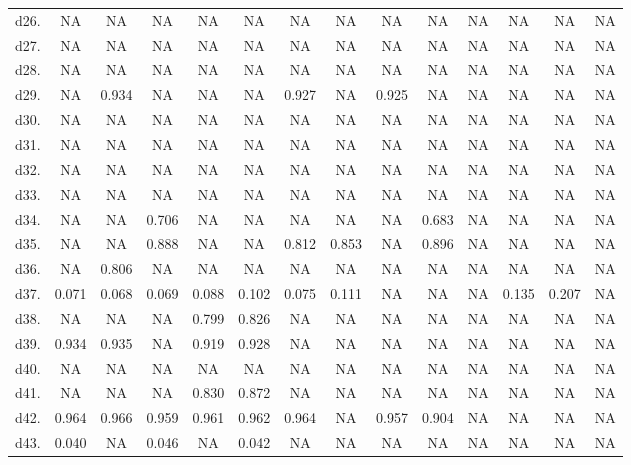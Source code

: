 \begin{table}
\begin{tabular}{lccccccccccccc}
d26.  & NA    & NA    & NA    & NA    & NA    & NA    & NA    & NA    & NA    & NA    & NA    & NA    & NA \\
d27.  & NA    & NA    & NA    & NA    & NA    & NA    & NA    & NA    & NA    & NA    & NA    & NA    & NA \\
d28.  & NA    & NA    & NA    & NA    & NA    & NA    & NA    & NA    & NA    & NA    & NA    & NA    & NA \\
d29.  & NA    & 0.934 & NA    & NA    & NA    & 0.927 & NA    & 0.925 & NA    & NA    & NA    & NA    & NA \\
d30.  & NA    & NA    & NA    & NA    & NA    & NA    & NA    & NA    & NA    & NA    & NA    & NA    & NA \\
d31.  & NA    & NA    & NA    & NA    & NA    & NA    & NA    & NA    & NA    & NA    & NA    & NA    & NA \\
d32.  & NA    & NA    & NA    & NA    & NA    & NA    & NA    & NA    & NA    & NA    & NA    & NA    & NA \\
d33.  & NA    & NA    & NA    & NA    & NA    & NA    & NA    & NA    & NA    & NA    & NA    & NA    & NA \\
d34.  & NA    & NA    & 0.706 & NA    & NA    & NA    & NA    & NA    & 0.683 & NA    & NA    & NA    & NA \\
d35.  & NA    & NA    & 0.888 & NA    & NA    & 0.812 & 0.853 & NA    & 0.896 & NA    & NA    & NA    & NA \\
d36.  & NA    & 0.806 & NA    & NA    & NA    & NA    & NA    & NA    & NA    & NA    & NA    & NA    & NA \\
d37.  & 0.071 & 0.068 & 0.069 & 0.088 & 0.102 & 0.075 & 0.111 & NA    & NA    & NA    & 0.135 & 0.207 & NA \\
d38.  & NA    & NA    & NA    & 0.799 & 0.826 & NA    & NA    & NA    & NA    & NA    & NA    & NA    & NA \\
d39.  & 0.934 & 0.935 & NA    & 0.919 & 0.928 & NA    & NA    & NA    & NA    & NA    & NA    & NA    & NA \\
d40.  & NA    & NA    & NA    & NA    & NA    & NA    & NA    & NA    & NA    & NA    & NA    & NA    & NA \\
d41.  & NA    & NA    & NA    & 0.830 & 0.872 & NA    & NA    & NA    & NA    & NA    & NA    & NA    & NA \\
d42.  & 0.964 & 0.966 & 0.959 & 0.961 & 0.962 & 0.964 & NA    & 0.957 & 0.904 & NA    & NA    & NA    & NA \\
d43.  & 0.040 & NA    & 0.046 & NA    & 0.042 & NA    & NA    & NA    & NA    & NA    & NA    & NA    & NA \\

\end{tabular}
\end{table}
